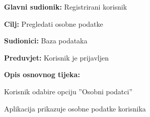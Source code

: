 \noindent {}
\begin{packed_item}
	
	\item \textbf{Glavni sudionik: }Registrirani korisnik
	\item  \textbf{Cilj:} Pregledati osobne podatke
	\item  \textbf{Sudionici:} Baza podataka
	\item  \textbf{Preduvjet:} Korisnik je prijavljen
	\item  \textbf{Opis osnovnog tijeka:}
	
	\item[] \begin{packed_enum}
		
		\item Korisnik odabire opciju ”Osobni podatci”
		\item Aplikacija prikazuje osobne podatke korisnika

	\end{packed_enum}
	
\end{packed_item}

